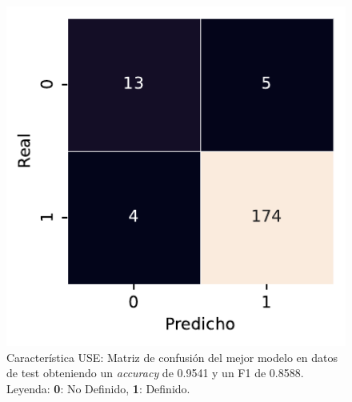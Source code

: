 \begin{figure}[htbp]
    \vspace{1.5em} %

    \includegraphics[width=0.6\linewidth]{figures/5_experiments/multi-use-cm.pdf}
    \caption[Característica USE: Matriz de confusión del mejor modelo en datos de test.]{Característica USE: Matriz de confusión del mejor modelo en datos de test obteniendo un \textit{accuracy} de 0.9541 y un F1 de 0.8588. Leyenda: \textbf{0}: No Definido, \textbf{1}: Definido.}
    \label{fig5:USE_confusion_matrix}
\end{figure}

